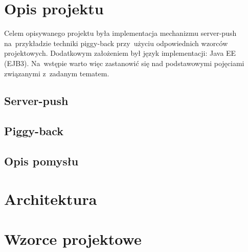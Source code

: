 \documentclass[11pt]{aghdpl}
\author{Wojciech Kasperek, Agnieszka Maksylewicz,}
\date{2014/2015}
\begin{document}
\titlepages
\vspace*{-20mm}
\tableofcontents
\clearpage

\chapter{Opis projektu}
Celem opisywanego projektu była implementacja mechanizmu server-push na~przykładzie techniki piggy-back przy~użyciu odpowiednich wzorców projektowych. Dodatkowym założeniem był język implementacji: Java EE (EJB3). Na~wstępie warto więc zastanowić się nad podstawowymi pojęciami związanymi z~zadanym tematem.

\section{Server-push}


\section{Piggy-back}

\section{Opis pomysłu}


\chapter{Architektura}

\chapter{Wzorce projektowe}
\end{document}

